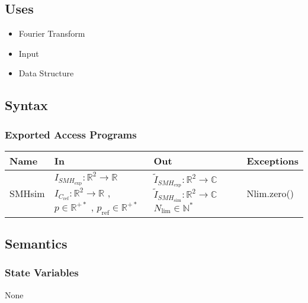 \documentclass[12pt, titlepage]{article}
\begin{document}
\subsection{Uses}
\begin{itemize}
\item Fourier Transform
\item Input
\item Data Structure
\end{itemize}

\subsection{Syntax}

\subsubsection{Exported Access Programs}

\begin{center}
\begin{tabular}{p{2cm} p{4cm} p{4cm} p{2cm}}
\hline
\textbf{Name} & \textbf{In} & \textbf{Out} & \textbf{Exceptions} \\
\hline
SMHsim & $I_{\mathit{SMH}_{\text{exp}}}:\mathbb{R}^2\rightarrow\mathbb{R} $ $ I_{C_{\text{ref}}}:\mathbb{R}^2\rightarrow\mathbb{R}$ , $p \in \mathbb{R}^{+*}$ , $p_{\text{ref}} \in \mathbb{R}^{+*}$ & $\widetilde{I}_{\mathit{SMH}_{\text{exp}}}:\mathbb{R}^2\rightarrow\mathbb{C}$ $\widetilde{I}_{\mathit{SMH}_{\text{sim}}}:\mathbb{R}^2\rightarrow\mathbb{C}$ $N_{\text{lim}} \in \mathbb{N}^{*}$ & Nlim.zero() \\
\hline
\end{tabular}
\end{center}

\subsection{Semantics}

\subsubsection{State Variables}
None
\end{document}
